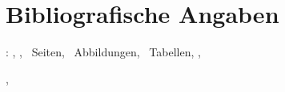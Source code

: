 
\chapter*{Bibliografische Angaben}
\label{sec:Referat}

\autor : \titel , \untertitel , \pageref*{LastPage}~Seiten, \totalfigures ~Abbildungen, \totaltables ~Tabellen, \hochschule , \fachbereich

\arbeit , \the\year

\Satz